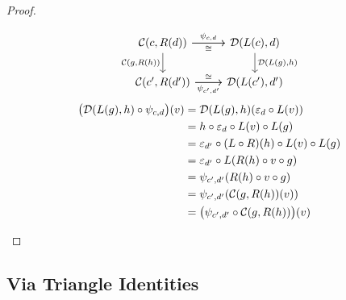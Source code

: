 \begin{theorem}
\begin{proof}
\begin{description}
        \[\begin{tikzcd}[ampersand replacement=\&]
          {\mathcal{C}(c, R(d))} \& {\mathcal{D}(L(c), d)} \\
          {\mathcal{C}(c', R(d'))} \& {\mathcal{D}(L(c'), d')}
          \arrow["{\psi_{c,d}}", from=1-1, to=1-2]
          \arrow["{\mathcal{D}(L(g),h)}", from=1-2, to=2-2]
          \arrow["{\psi_{c',d'}}"', from=2-1, to=2-2]
          \arrow["{\mathcal{C}(g,R(h))}"', from=1-1, to=2-1]
          \arrow["\cong"', from=1-1, to=1-2]
          \arrow["\cong", from=2-1, to=2-2]
        \end{tikzcd}\]
        \[
          \begin{aligned}
            \big(\mathcal{D}(L(g), h)\circ \psi_{c, d}\big)(v)
            &= \mathcal{D}(L(g), h) (\varepsilon_d \circ L(v))\\
            &= h \circ \varepsilon_d \circ L(v) \circ L(g)\\
            &= \varepsilon_{d'}\circ (L\circ R)(h) \circ L(v) \circ L(g)\\
            &= \varepsilon_{d'}\circ L(R(h) \circ v \circ g)\\
            &= \psi_{c', d'} (R(h) \circ v \circ g)\\
            &= \psi_{c', d'} (\mathcal{C}(g, R(h))(v))\\
            &= \big(\psi_{c', d'} \circ \mathcal{C}(g, R(h))\big)(v)
          \end{aligned}
        \]
    \end{description}
  \end{proof}
\end{theorem}

\subsection{Via Triangle Identities}

